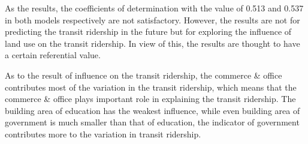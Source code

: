 %
As the results, the coefficients of determination with the value of 0.513 and 0.537 in both models respectively are not satisfactory. However, the results are not for predicting the transit ridership in the future but for exploring the influence of land use on the transit ridership. In view of this, the results are thought to have a certain referential value. 

%
As to the result of influence on the transit ridership, the commerce \& office contributes most of the variation in the transit ridership, which means that the commerce \& office plays important role in explaining the transit ridership. The building area of education has the weakest influence, while even building area of government is much smaller than that of education, the indicator of government contributes more to the variation in transit ridership. 


